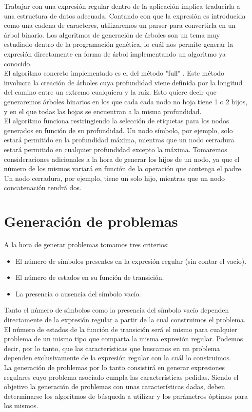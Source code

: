 
Trabajar con una expresión regular dentro de la aplicación implica traducirla a una estructura de datos adecuada.
Contando con que la expresión es introducida como una cadena de caracteres, utilizaremos un parser para convertirla en un árbol binario.
Los algoritmos de generación de árboles son un tema muy estudiado dentro de la programación genética, lo cuál nos permite generar la expresión directamente en forma de árbol implementando un algoritmo ya conocido.
\\
El algoritmo concreto implementado es el del método "full" \cite{koza92}.
Este método involucra la creación de árboles cuya profundidad viene definida por la longitud del camino entre un extremo cualquiera y la raíz.
Esto quiere decir que generaremos árboles binarios en los que cada cada nodo no hoja tiene 1 o 2 hijos, y en el que todas las hojas se encuentran a la misma profundidad.
\\
El algoritmo funciona restringiendo la selección de etiquetas para los nodos generados en función de su profundidad.
Un nodo símbolo, por ejemplo, solo estará permitido en la profundidad máxima, mientras que un nodo cerradura estará permitido en cualquier profundidad excepto la máxima.
Tomaremos consideraciones adicionales a la hora de generar los hijos de un nodo, ya que el número de los mismos variará en función de la operación que contenga el padre.
Un nodo cerradura, por ejemplo, tiene un solo hijo, mientras que un nodo concatenación tendrá dos.

\section{Generación de problemas}

A la hora de generar problemas tomamos tres criterios:
\begin{itemize}
	\item El número de símbolos presentes en la expresión regular (sin contar el vacío).
	\item El número de estados en su función de transición.
	\item La presencia o ausencia del símbolo vacío.
\end{itemize}
Tanto el número de símbolos como la presencia del símbolo vacío dependen directamente de la expresión regular a partir de la cual construimos el problema.
El número de estados de la función de transición será el mismo para cualquier problema de un mismo tipo que comparta la misma expresión regular.
Podemos decir, por lo tanto, que las características que buscamos en un problema dependen exclusivamente de la expresión regular con la cuál lo construimos.
\\
La generación de problemas por lo tanto consistirá en generar expresiones regulares cuyo problema asociado cumpla las características pedidas.
Siendo el objetivo la generación de problemas con unas características dadas, deben determinarse los algoritmos de búsqueda a utilizar y los parámetros óptimos para los mismos.

